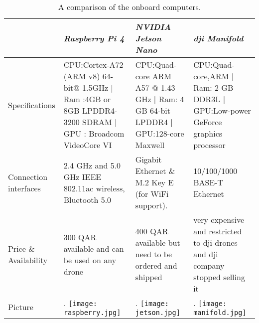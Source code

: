 \documentclass[../main.tex]{subfiles}
\begin{document}
\begin{table}[H]
        \centering
	\caption{A comparison of the onboard computers.}
        \label{tab:onboard-computers}  
	\begin{tabular}{ p{3cm} p{4cm} p{4cm} p{4cm} }
		\toprule
		\textit{} & \textit{Raspberry Pi 4} & \textit{NVIDIA Jetson Nano} & \textit{dji Manifold}\\ \midrule
		Specifications  & CPU:Cortex-A72 (ARM v8) 64-bit@ 1.5GHz | Ram :4GB or 8GB LPDDR4-3200 SDRAM | GPU : Broadcom VideoCore VI & CPU:Quad-core ARM A57 @ 1.43 GHz | Ram: 4 GB 64-bit LPDDR4   | GPU:128-core Maxwell & CPU:Quad-core,ARM | Ram: 2 GB DDR3L | GPU:Low-power GeForce graphics processor \\ \addlinespace
		Connection interfaces & 2.4 GHz and 5.0 GHz IEEE 802.11ac wireless, Bluetooth 5.0 & Gigabit Ethernet \& M.2 Key E (for WiFi support). &10/100/1000 BASE-T Ethernet \\ \addlinespace
		
		Price \& Availability & 300 QAR available and can be used on any drone & 400 QAR available but need to be ordered and shipped & very expensive and restricted to dji drones and dji company stopped selling it \\ \addlinespace
		Picture & \begin{minipage}{.2\textwidth}.
			\texttt{[image: raspberry.jpg]}
		\end{minipage}  & \begin{minipage}{.2\textwidth}.
		\texttt{[image: jetson.jpg]}
	\end{minipage} & \begin{minipage}{.2\textwidth}.
	\texttt{[image: manifold.jpg]}
\end{minipage} \\
            \bottomrule
	\end{tabular}
\end{table}
\newpage
\end{document}
